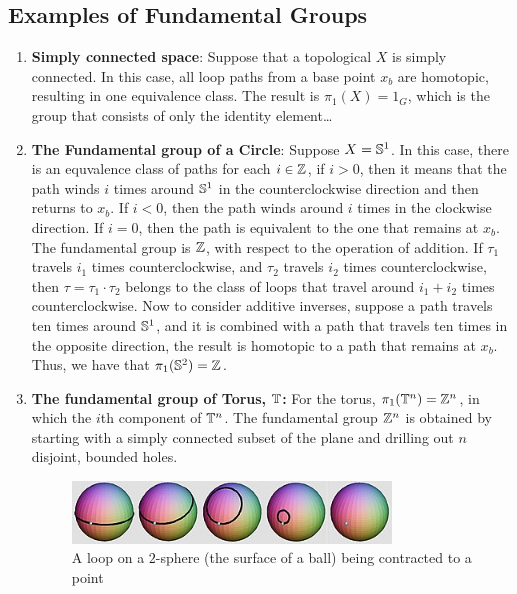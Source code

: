 \subsection{Examples of Fundamental Groups}
\begin{enumerate}
    \item \textbf{Simply connected space}: Suppose that a topological $X$ is simply connected. In this case, all loop paths from a base point $x_b$  are homotopic, resulting in one equivalence class. The result is $\pi_1(X) = 1_G$, which is the group that consists of only the identity element\dots

    \item \textbf{The Fundamental group of a Circle}: Suppose $X = \mathbb{S}^1$.
    In this case, there is an equvalence class of paths for each $i \in \mathbb{Z}$, if $i > 0$, then it means  that the path winds $i$ times around $\mathbb{S}^1$ in the counterclockwise direction and then returns to $x_b$. If $i < 0$, then the path winds around $i$ times in the clockwise direction.
    If $i = 0$, then the path is equivalent to the one that remains at $x_b$. The fundamental group is $\mathbb{Z}$, with respect to the operation of addition. If $\tau_1$ travels $i_1$ times counterclockwise, and $\tau_2$ travels $i_2$ times counterclockwise, then $\tau = \tau_1 \cdot \tau_2$ belongs to the class of loops that travel around $i_1 + i_2$ times counterclockwise.
    Now to consider additive inverses, suppose a path travels ten times around $\mathbb{S}^1$, and it is combined with a path that travels ten times in the opposite direction, the result is homotopic to a path that remains at $x_b$. Thus, we have that $\pi_1(\mathbb{S}^2) = \mathbb{Z}$.
    \item \textbf{The fundamental group of Torus, $\mathbb{T}$:} For the torus, $\pi_1(\mathbb{T}^n) = \mathbb{Z}^n$, in which the $i$th component of $\mathbb{T}^n$. The fundamental group $\mathbb{Z}^n$ is obtained by starting with a simply connected subset of the plane  and drilling out $n$ disjoint, bounded holes.
          \begin{figure}[H]
              \begin{center}
                  \includegraphics[width=0.8\textwidth]{images/sphere-homo}
              \end{center}
              \caption[A loop on a $2$-sphere (the surface of a ball) beiing contracted to a point]{A loop on a $2$-sphere (the surface of a ball) being contracted to a point \cite{enwiki:fg}
              }
          \end{figure}
\end{enumerate}
